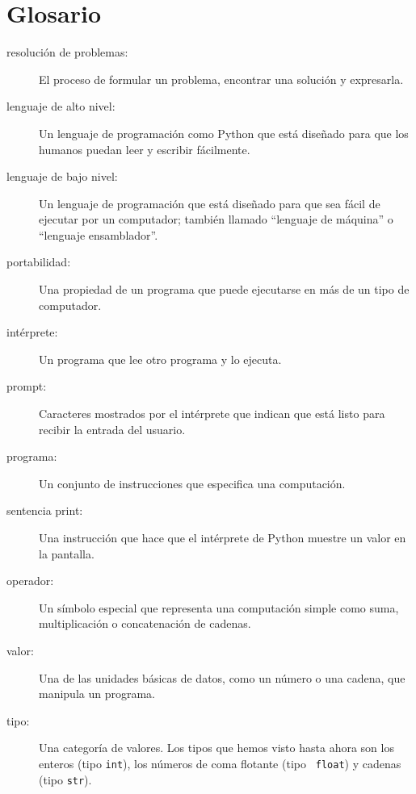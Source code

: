 \documentclass[10pt]{book}
\begin{document}
\section{Glosario}

\begin{description}

\item[resolución de problemas:]  El proceso de formular un problema, encontrar
una solución y expresarla.

\item[lenguaje de alto nivel:]  Un lenguaje de programación como Python que
está diseñado para que los humanos puedan leer y escribir fácilmente.

\item[lenguaje de bajo nivel:]  Un lenguaje de programación que está diseñado
para que sea fácil de ejecutar por un computador; también llamado ``lenguaje de máquina'' o
``lenguaje ensamblador''.

\item[portabilidad:]  Una propiedad de un programa que puede ejecutarse en más
de un tipo de computador.

\item[intérprete:]  Un programa que lee otro programa y lo
ejecuta.

\item[prompt:] Caracteres mostrados por el intérprete que indican
que está listo para recibir la entrada del usuario.

\item[programa:] Un conjunto de instrucciones que especifica una computación.

\item[sentencia print:]  Una instrucción que hace que el intérprete de Python
muestre un valor en la pantalla.

\item[operador:]  Un símbolo especial que representa una computación simple
como suma, multiplicación o concatenación de cadenas.

\item[valor:]  Una de las unidades básicas de datos, como un número o una cadena,
que manipula un programa.

\item[tipo:] Una categoría de valores.  Los tipos que hemos visto hasta ahora
son los enteros (tipo {\tt int}), los números de coma flotante (tipo {\tt
float}) y cadenas (tipo {\tt str}).


\end{description}
\end{document}
